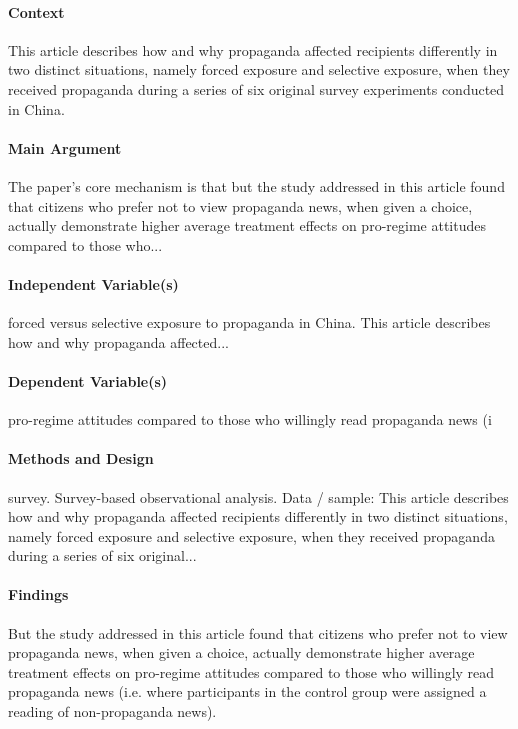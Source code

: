 \documentclass[12pt]{article}
\begin{document}
\paragraph{Context} This article describes how and why propaganda affected recipients differently in two distinct situations, namely forced exposure and selective exposure, when they received propaganda during a series of six original survey experiments conducted in China.

\paragraph{Main Argument} The paper's core mechanism is that but the study addressed in this article found that citizens who prefer not to view propaganda news, when given a choice, actually demonstrate higher average treatment effects on pro-regime attitudes compared to those who...

\paragraph{Independent Variable(s)} forced versus selective exposure to propaganda in China. This article describes how and why propaganda affected...

\paragraph{Dependent Variable(s)} pro-regime attitudes compared to those who willingly read propaganda news (i

\paragraph{Methods and Design} survey. Survey-based observational analysis. Data / sample: This article describes how and why propaganda affected recipients differently in two distinct situations, namely forced exposure and selective exposure, when they received propaganda during a series of six original...

\paragraph{Findings} But the study addressed in this article found that citizens who prefer not to view propaganda news, when given a choice, actually demonstrate higher average treatment effects on pro-regime attitudes compared to those who willingly read propaganda news (i.e. where participants in the control group were assigned a reading of non-propaganda news).
\end{document}
